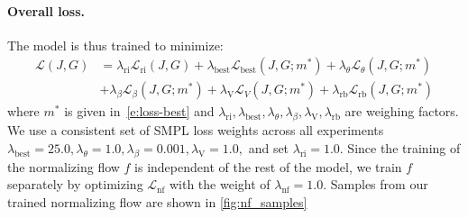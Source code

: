 \paragraph{Overall loss.}

The model is thus trained to minimize:
\begin{equation}\label{e:loss-total}
  \begin{aligned}
    \mathcal{L}(J,G)&=
    \lambda_\text{ri} \mathcal{L}_\text{ri}(J,G) +
    \lambda_\text{best} \mathcal{L}_\text{best}(J,G;m^*) +
    \lambda_\theta \mathcal{L}_\theta(J,G;m^*) \\& +
    \lambda_\beta \mathcal{L}_\beta(J,G;m^*) +
    \lambda_\text{V} \mathcal{L}_V(J,G;m^*) +
    \lambda_\text{rb} \mathcal{L}_\text{rb}(J,G;m^*)
  \end{aligned}
\end{equation}
where $m^*$ is given in~\cref{e:loss-best} and
$
\lambda_\text{ri},
\lambda_\text{best},
\lambda_\theta,
\lambda_\beta,
\lambda_\text{V},
\lambda_\text{rb}
$
are weighing factors.
We use a consistent set of SMPL loss weights across all experiments
$\lambda_\text{best}= 25.0, \lambda_\theta=1.0,
\lambda_\beta=0.001,
\lambda_\text{V}=1.0,
$ and set $\lambda_\text{ri} = 1.0$.
%
Since the training of the normalizing flow $f$ is independent of the rest of the model, we train $f$ separately by optimizing $\mathcal{L}_\text{nf}$ with the weight of $\lambda_\text{nf}=1.0$. Samples from our trained normalizing flow are shown in \cref{fig:nf_samples}

